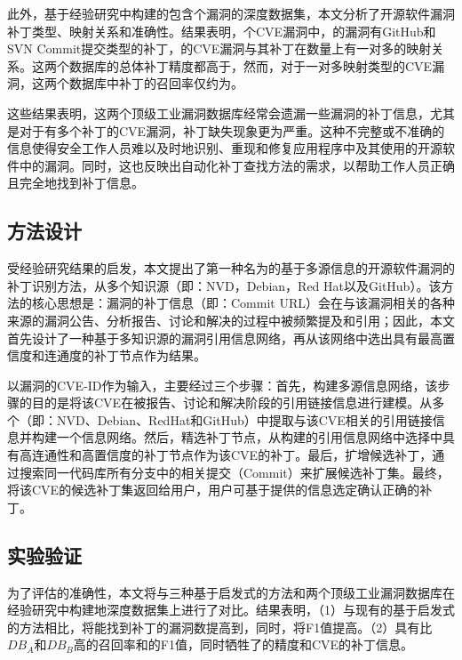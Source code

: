 此外，基于经验研究中构建的包含个漏洞的深度数据集，本文分析了开源软件漏洞补丁类型、映射关系和准确性。结果表明，个CVE漏洞中，的漏洞有GitHub和SVN Commit提交类型的补丁，的CVE漏洞与其补丁在数量上有一对多的映射关系。这两个数据库的总体补丁精度都高于，然而，对于一对多映射类型的CVE漏洞，这两个数据库中补丁的召回率仅约为。

这些结果表明，这两个顶级工业漏洞数据库经常会遗漏一些漏洞的补丁信息，尤其是对于有多个补丁的CVE漏洞，补丁缺失现象更为严重。这种不完整或不准确的信息使得安全工作人员难以及时地识别、重现和修复应用程序中及其使用的开源软件中的漏洞。同时，这也反映出自动化补丁查找方法的需求，以帮助工作人员正确且完全地找到补丁信息。

\subsection{方法设计}
受经验研究结果的启发，本文提出了第一种名为\tool 的基于多源信息的开源软件漏洞的补丁识别方法，从多个知识源（即：NVD\cite{nvd}，Debian\cite{debian}，Red Hat\cite{redhat}以及GitHub）。该方法的核心思想是：漏洞的补丁信息（即：Commit URL）会在与该漏洞相关的各种来源的漏洞公告、分析报告、讨论和解决的过程中被频繁提及和引用；因此，本文首先设计了一种基于多知识源的漏洞引用信息网络，再从该网络中选出具有最高置信度和连通度的补丁节点作为结果。

\tool 以漏洞的CVE-ID作为输入，主要经过三个步骤：首先，构建多源信息网络，该步骤的目的是将该CVE在被报告、讨论和解决阶段的引用链接信息进行建模。\tool 从多个（即：NVD、Debian\cite{debian}、RedHat\cite{redhat}和GitHub）中提取与该CVE相关的引用链接信息并构建一个信息网络。然后，精选补丁节点，\tool 从构建的引用信息网络中选择中具有高连通性和高置信度的补丁节点作为该CVE的补丁。最后，扩增候选补丁，\tool 通过搜索同一代码库所有分支中的相关提交（Commit）来扩展候选补丁集。最终，\tool 将该CVE的候选补丁集返回给用户，用户可基于\tool 提供的信息选定确认正确的补丁。

\subsection{实验验证}
为了评估\tool 的准确性，本文将\tool 与三种基于启发式的方法和两个顶级工业漏洞数据库在经验研究中构建地深度数据集上进行了对比。结果表明，（1）与现有的基于启发式的方法相比，\tool 将能找到补丁的漏洞数提高到，同时，将F1值提高。（2）\tool 具有比$DB_A$和$DB_B$高的召回率和的F1值，同时牺牲了的精度和CVE的补丁信息。

